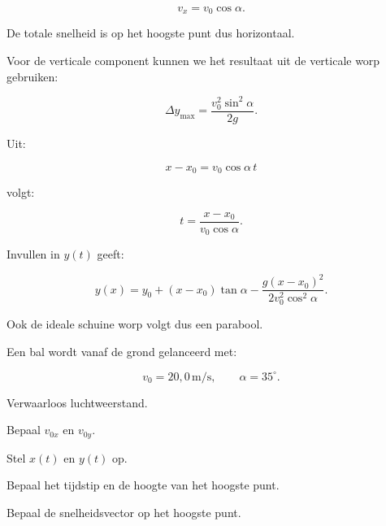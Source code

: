 \documentclass{ximera}
\begin{document}
\[
v_x=v_0\cos\alpha.
\]

De totale snelheid is op het hoogste punt dus horizontaal.



Voor de verticale component kunnen we het resultaat uit de verticale
worp gebruiken:

\[
\boxed{
\Delta y_{\max}
=
\frac{v_0^2\sin^2\alpha}{2g}.
}
\]



Uit:

\[
x-x_0=v_0\cos\alpha\,t
\]

volgt:

\[
t
=
\frac{x-x_0}{v_0\cos\alpha}.
\]

Invullen in $y(t)$ geeft:

\[
\boxed{
y(x)
=
y_0
+
(x-x_0)\tan\alpha
-
\frac{g(x-x_0)^2}
{2v_0^2\cos^2\alpha}.
}
\]

Ook de ideale schuine worp volgt dus een parabool.


\begin{oefening}{\oefU}

Een bal wordt vanaf de grond gelanceerd met:

\[
v_0=20,0\,\mathrm{m/s},
\qquad
\alpha=35^\circ.
\]

Verwaarloos luchtweerstand.

\begin{question}
Bepaal $v_{0x}$ en $v_{0y}$.
\end{question}

\begin{question}
Stel $x(t)$ en $y(t)$ op.
\end{question}

\begin{question}
Bepaal het tijdstip en de hoogte van het hoogste punt.
\end{question}

\begin{question}
Bepaal de snelheidsvector op het hoogste punt.
\end{question}

\end{oefening}



\end{document}
